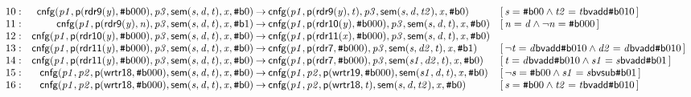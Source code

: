 \documentclass[a4paper]{article}
\newcommand{\ttsym}[1]{\mbox{\tt #1}}
\def\ttsharp{\ttsym{\symbol{35}}}
\newcommand{\symb}[1]{\mathsf{#1}}
\newcommand{\var}[1]{\mathit{#1}}
\newcommand{\Constraint}[1]{[\, #1 \,]}
\newcommand{\bv}[2][b]{{\ttsharp\symb{#1}{#2}}}
\begin{document}
\begin{landscape}
\[\begin{array}{rr@{\>}c@{\>}ll}
\mathrm{10} : 
 & \symb{cnfg}(\var{p1},\symb{p}(\symb{rdr9}(\var{y}),\bv{000}),\var{p3},\symb{sem}(\var{s},\var{d},\var{t}),\var{x},\bv{0})
 & \to 
 & \symb{cnfg}(\var{p1},\symb{p}(\symb{rdr9}(\var{y}),\var{t}),\var{p3},\symb{sem}(\var{s},\var{d},\var{t2}),\var{x},\bv{0})
 & \Constraint{\var{s} = \bv{00} \land \var{t2} = \var{t} \symb{bvadd} \bv{010}}\\

\mathrm{11} : 
 & \symb{cnfg}(\var{p1},\symb{p}(\symb{rdr9}(\var{y}),\var{n}),\var{p3},\symb{sem}(\var{s},\var{d},\var{t}),\var{x},\bv{1})
 & \to 
 & \symb{cnfg}(\var{p1},\symb{p}(\symb{rdr10}(\var{y}),\bv{000}),\var{p3},\symb{sem}(\var{s},\var{d},\var{t}),\var{x},\bv{0})
 & \Constraint{\var{n} = \var{d} \land \neg \var{n} = \bv{000}}\\

\mathrm{12} : 
 & \symb{cnfg}(\var{p1},\symb{p}(\symb{rdr10}(\var{y}),\bv{000}),\var{p3},\symb{sem}(\var{s},\var{d},\var{t}),\var{x},\bv{0})
 & \to 
 & \symb{cnfg}(\var{p1},\symb{p}(\symb{rdr11}(\var{x}),\bv{000}),\var{p3},\symb{sem}(\var{s},\var{d},\var{t}),\var{x},\bv{0})\\

\mathrm{13} : 
 & \symb{cnfg}(\var{p1},\symb{p}(\symb{rdr11}(\var{y}),\bv{000}),\var{p3},\symb{sem}(\var{s},\var{d},\var{t}),\var{x},\bv{0})
 & \to 
 & \symb{cnfg}(\var{p1},\symb{p}(\symb{rdr7},\bv{000}),\var{p3},\symb{sem}(\var{s},\var{d2},\var{t}),\var{x},\bv{1})
 & \Constraint{\neg \var{t} = \var{d} \symb{bvadd} \bv{010} \land \var{d2} = \var{d} \symb{bvadd} \bv{010}}\\

\mathrm{14} : 
 & \symb{cnfg}(\var{p1},\symb{p}(\symb{rdr11}(\var{y}),\bv{000}),\var{p3},\symb{sem}(\var{s},\var{d},\var{t}),\var{x},\bv{0})
 & \to 
 & \symb{cnfg}(\var{p1},\symb{p}(\symb{rdr7},\bv{000}),\var{p3},\symb{sem}(\var{s1},\var{d2},\var{t}),\var{x},\bv{0})
 & \Constraint{\var{t} = \var{d} \symb{bvadd} \bv{010} \land \var{s1} = \var{s} \symb{bvadd} \bv{01}}\\

\mathrm{15} : 
 & \symb{cnfg}(\var{p1},\var{p2},\symb{p}(\symb{wrtr18},\bv{000}),\symb{sem}(\var{s},\var{d},\var{t}),\var{x},\bv{0})
 & \to 
 & \symb{cnfg}(\var{p1},\var{p2},\symb{p}(\symb{wrtr19},\bv{000}),\symb{sem}(\var{s1},\var{d},\var{t}),\var{x},\bv{0})
 & \Constraint{\neg \var{s} = \bv{00} \land \var{s1} = \var{s} \symb{bvsub} \bv{01}}\\

\mathrm{16} : 
 & \symb{cnfg}(\var{p1},\var{p2},\symb{p}(\symb{wrtr18},\bv{000}),\symb{sem}(\var{s},\var{d},\var{t}),\var{x},\bv{0})
 & \to 
 & \symb{cnfg}(\var{p1},\var{p2},\symb{p}(\symb{wrtr18},\var{t}),\symb{sem}(\var{s},\var{d},\var{t2}),\var{x},\bv{0})
 & \Constraint{\var{s} = \bv{00} \land \var{t2} = \var{t} \symb{bvadd} \bv{010}}\\


\end{array}\]
\end{landscape}
\end{document}
